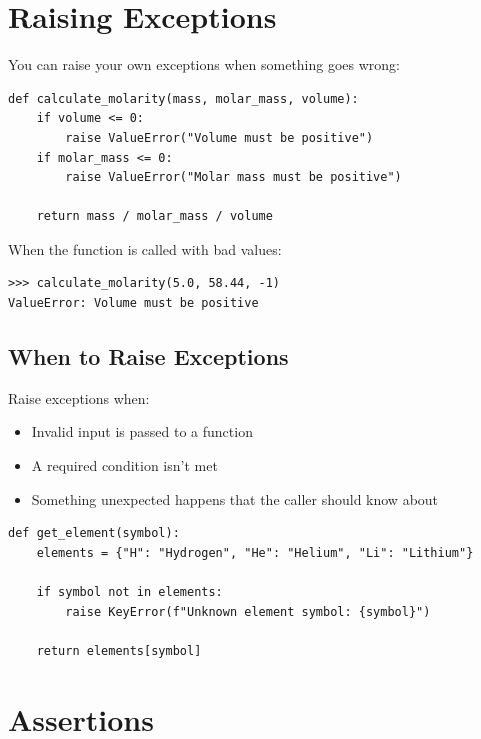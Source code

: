 \section{Raising Exceptions}
\label{sec:raising}

You can raise your own exceptions when something goes wrong:

\begin{lstlisting}
def calculate_molarity(mass, molar_mass, volume):
    if volume <= 0:
        raise ValueError("Volume must be positive")
    if molar_mass <= 0:
        raise ValueError("Molar mass must be positive")

    return mass / molar_mass / volume
\end{lstlisting}

When the function is called with bad values:

\begin{lstlisting}
>>> calculate_molarity(5.0, 58.44, -1)
ValueError: Volume must be positive
\end{lstlisting}

\subsection{When to Raise Exceptions}

Raise exceptions when:
\begin{itemize}
    \item Invalid input is passed to a function
    \item A required condition isn't met
    \item Something unexpected happens that the caller should know about
\end{itemize}

\begin{lstlisting}
def get_element(symbol):
    elements = {"H": "Hydrogen", "He": "Helium", "Li": "Lithium"}

    if symbol not in elements:
        raise KeyError(f"Unknown element symbol: {symbol}")

    return elements[symbol]
\end{lstlisting}

\section{Assertions}
\label{sec:assertions}

